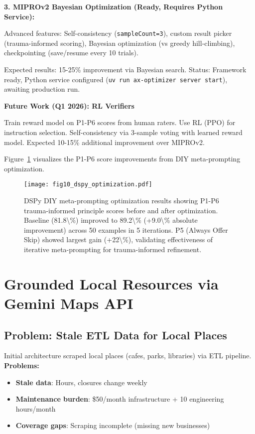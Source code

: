 \documentclass{article}
\begin{document}
\textbf{3. MIPROv2 Bayesian Optimization (Ready, Requires Python Service):}

Advanced features: Self-consistency (\texttt{sampleCount=3}), custom result picker (trauma-informed scoring), Bayesian optimization (vs greedy hill-climbing), checkpointing (save/resume every 10 trials).

Expected results: 15-25\% improvement via Bayesian search. Status: Framework ready, Python service configured (\texttt{uv run ax-optimizer server start}), awaiting production run.

\textbf{Future Work (Q1 2026): RL Verifiers}

Train reward model on P1-P6 scores from human raters. Use RL (PPO) for instruction selection. Self-consistency via 3-sample voting with learned reward model. Expected 10-15\% additional improvement over MIPROv2.

Figure~\ref{fig:dspy} visualizes the P1-P6 score improvements from DIY meta-prompting optimization.

%
\begin{figure}[htbp]%
\centering%
\texttt{[image: fig10\_dspy\_optimization.pdf]}%
\caption{DSPy DIY meta-prompting optimization results showing P1-P6 trauma-informed principle scores before and after optimization. Baseline (81.8\textbackslash{}\%) improved to 89.2\textbackslash{}\% (+9.0\textbackslash{}\% absolute improvement) across 50 examples in 5 iterations. P5 (Always Offer Skip) showed largest gain (+22\textbackslash{}\%), validating effectiveness of iterative meta-prompting for trauma-informed refinement.}%
\label{fig:dspy}%
\end{figure}%
\section{Grounded Local Resources via Gemini Maps API}%
\label{sec:GroundedLocalResourcesviaGeminiMapsAPI}%
%
\subsection{Problem: Stale ETL Data for Local Places}%
\label{subsec:ProblemStaleETLDataforLocalPlaces}%
Initial architecture scraped local places (cafes, parks, libraries) via ETL pipeline. \textbf{Problems:}
\begin{itemize}
    \item \textbf{Stale data}: Hours, closures change weekly
    \item \textbf{Maintenance burden}: \$50/month infrastructure + 10 engineering hours/month
    \item \textbf{Coverage gaps}: Scraping incomplete (missing new businesses)
\end{itemize}
\end{document}
